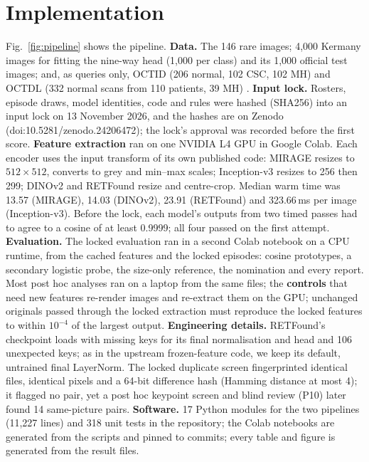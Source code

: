 \documentclass[conference]{IEEEtran}
\begin{document}
\section{Implementation}
Fig.~\ref{fig:pipeline} shows the pipeline. \textbf{Data.} The 146 rare images; 4,000 Kermany images for fitting the nine-way head (1,000 per class) and its 1,000 official test images; and, as queries only, OCTID (206 normal, 102 CSC, 102 MH) \cite{OCTID2020} and OCTDL (332 normal scans from 110 patients, 39 MH) \cite{OCTDL2024}.
\textbf{Input lock.} Rosters, episode draws, model identities, code and rules were hashed (SHA256) into an input lock on 13 November 2026, and the hashes are on Zenodo (doi:10.5281/zenodo.24206472); the lock's approval was recorded before the first score.
\textbf{Feature extraction} ran on one NVIDIA L4 GPU in Google Colab. Each encoder uses the input transform of its own published code: MIRAGE resizes to $512\times512$, converts to grey and min--max scales; Inception-v3 resizes to 256 then 299; DINOv2 and RETFound resize and centre-crop. Median warm time was 13.57 (MIRAGE), 14.03 (DINOv2), 23.91 (RETFound) and 323.66\,ms per image (Inception-v3). Before the lock, each model's outputs from two timed passes had to agree to a cosine of at least 0.9999; all four passed on the first attempt.
\textbf{Evaluation.} The locked evaluation ran in a second Colab notebook on a CPU runtime, from the cached features and the locked episodes: cosine prototypes, a secondary logistic probe, the size-only reference, the nomination and every report. Most post hoc analyses ran on a laptop from the same files; the \textbf{controls} that need new features re-render images and re-extract them on the GPU; unchanged originals passed through the locked extraction must reproduce the locked features to within $10^{-4}$ of the largest output.
\textbf{Engineering details.} RETFound's checkpoint loads with missing keys for its final normalisation and head and 106 unexpected keys; as in the upstream frozen-feature code, we keep its default, untrained final LayerNorm. The locked duplicate screen fingerprinted identical files, identical pixels and a 64-bit difference hash (Hamming distance at most 4); it flagged no pair, yet a post hoc keypoint screen and blind review (P10) later found 14 same-picture pairs.
\textbf{Software.} 17 Python modules for the two pipelines (11,227 lines) and 318 unit tests in the repository; the Colab notebooks are generated from the scripts and pinned to commits; every table and figure is generated from the result files.
\end{document}
